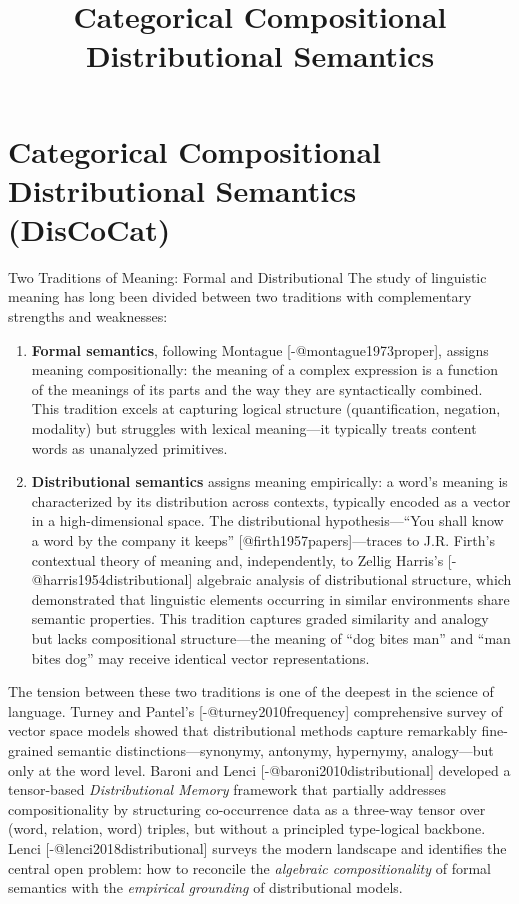 \documentclass[
  ignorenonframetext,
]{beamer}
\title{\texorpdfstring{Categorical Compositional Distributional
Semantics}{Categorical Compositional Distributional Semantics}}
\author{\texorpdfstring{}{}}
\date{}
\begin{document}
\frame{\titlepage}

\section{Categorical Compositional Distributional Semantics
(DisCoCat)}\label{sec:categorical-semantics}

\begin{frame}{Two Traditions of Meaning: Formal and Distributional}
\protect{}\label{two-traditions-of-meaning-formal-and-distributional}
The study of linguistic meaning has long been divided between two
traditions with complementary strengths and weaknesses:

\begin{enumerate}
\item
  \textbf{Formal semantics}, following Montague
  {[}-@montague1973proper{]}, assigns meaning compositionally: the
  meaning of a complex expression is a function of the meanings of its
  parts and the way they are syntactically combined. This tradition
  excels at capturing logical structure (quantification, negation,
  modality) but struggles with lexical meaning---it typically treats
  content words as unanalyzed primitives.
\item
  \textbf{Distributional semantics} assigns meaning empirically: a
  word's meaning is characterized by its distribution across contexts,
  typically encoded as a vector in a high-dimensional space. The
  distributional hypothesis---``You shall know a word by the company it
  keeps'' {[}@firth1957papers{]}---traces to J.R. Firth's contextual
  theory of meaning and, independently, to Zellig Harris's
  {[}-@harris1954distributional{]} algebraic analysis of distributional
  structure, which demonstrated that linguistic elements occurring in
  similar environments share semantic properties. This tradition
  captures graded similarity and analogy but lacks compositional
  structure---the meaning of ``dog bites man'' and ``man bites dog'' may
  receive identical vector representations.
\end{enumerate}

The tension between these two traditions is one of the deepest in the
science of language. Turney and Pantel's {[}-@turney2010frequency{]}
comprehensive survey of vector space models showed that distributional
methods capture remarkably fine-grained semantic
distinctions---synonymy, antonymy, hypernymy, analogy---but only at the
word level. Baroni and Lenci {[}-@baroni2010distributional{]} developed
a tensor-based \emph{Distributional Memory} framework that partially
addresses compositionality by structuring co-occurrence data as a
three-way tensor over (word, relation, word) triples, but without a
principled type-logical backbone. Lenci {[}-@lenci2018distributional{]}
surveys the modern landscape and identifies the central open problem:
how to reconcile the \emph{algebraic compositionality} of formal
semantics with the \emph{empirical grounding} of distributional models.


\end{frame}
\end{document}
